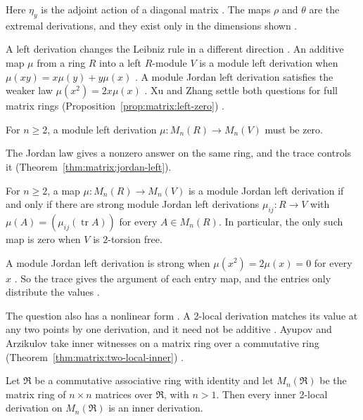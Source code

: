 Here $\eta_y$ is the adjoint action of a diagonal matrix
\cite[p.~379]{OuWangYao2007}. The maps $\rho$ and $\theta$ are the extremal
derivations, and they exist only in the dimensions shown
\cite[pp.~379--380]{OuWangYao2007}.

A left derivation changes the Leibniz rule in a different direction
\cite[p.~753]{XuZhang2010Left}. An additive map $\mu$ from a ring $R$ into a
left $R$-module $V$ is a module left derivation when $\mu(xy)=x\mu(y)+y\mu(x)$
\cite[p.~753]{XuZhang2010Left}. A module Jordan left derivation satisfies the
weaker law $\mu(x^{2})=2x\mu(x)$ \cite[p.~754]{XuZhang2010Left}. Xu and Zhang
settle both questions for full matrix rings
(Proposition~\ref{prop:matrix:left-zero})
\cite[pp.~755--757]{XuZhang2010Left}.

\begin{proposition}\label{prop:matrix:left-zero}
For $n\geq2$, a module left derivation $\mu\colon M_n(R)\to M_n(V)$ must be
zero.
\end{proposition}

The Jordan law gives a nonzero answer on the same ring, and the trace controls
it (Theorem~\ref{thm:matrix:jordan-left}).

\begin{theorem}\label{thm:matrix:jordan-left}
For $n\geq2$, a map $\mu\colon M_n(R)\to M_n(V)$ is a module Jordan left
derivation if and only if there are strong module Jordan left derivations
$\mu_{ij}\colon R\to V$ with $\mu(A)=(\mu_{ij}(\operatorname{tr}A))$ for every
$A\in M_n(R)$. In particular, the only such map is zero when $V$ is $2$-torsion
free.
\end{theorem}

A module Jordan left derivation is strong when $\mu(x^{2})=2\mu(x)=0$ for
every $x$ \cite[p.~754]{XuZhang2010Left}. So the trace gives the argument of
each entry map, and the entries only distribute the values
\cite[pp.~756--757]{XuZhang2010Left}.

The question also has a nonlinear form \cite[p.~1]{AyupovArzikulov2013}. A
2-local derivation matches its value at any two points by one derivation, and
it need not be additive \cite[p.~1]{AyupovArzikulov2013}. Ayupov and Arzikulov
take inner witnesses on a matrix ring over a commutative ring
(Theorem~\ref{thm:matrix:two-local-inner}) \cite[Theorem~2.1,
p.~2]{AyupovArzikulov2013}.\begin{theorem}\label{thm:matrix:two-local-inner} Let $\Re$ be a
commutative associative ring with identity and let $M_n(\Re)$ be the matrix
ring of $n\times n$ matrices over $\Re$, with $n>1$. Then every inner 2-local
derivation on $M_n(\Re)$ is an inner derivation. \end{theorem}


